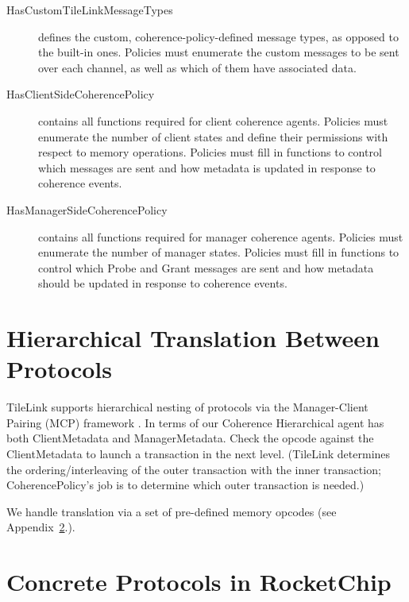 \begin{description}
\item[HasCustomTileLinkMessageTypes] defines the custom, coherence-policy-defined message types, as opposed to the built-in ones. Policies must enumerate the custom messages to be sent over each channel, as well as which of them have associated data.
\item[HasClientSideCoherencePolicy] contains all functions required for client coherence agents. Policies must enumerate the number of client states and define their permissions with respect to memory operations. Policies must fill in functions to control which messages are sent and how metadata is updated in response to coherence events.
\item[HasManagerSideCoherencePolicy] contains all functions required for manager coherence agents. Policies must enumerate the number of manager states. Policies must fill in functions to control which Probe and Grant messages are sent and how  metadata should be updated in response to coherence events.
\end{description}


\section{Hierarchical Translation Between Protocols}

TileLink supports hierarchical nesting of protocols via the Manager-Client Pairing (MCP) framework \cite{beu2011manager}.
In terms of our Coherence 
Hierarchical agent has both ClientMetadata and ManagerMetadata. 
Check the opcode against the ClientMetadata to launch a transaction in the next level.
(TileLink determines the ordering/interleaving of the outer transaction with the inner transaction;
CoherencePolicy's job is to determine which outer transaction is needed.)

We handle translation via a set of pre-defined memory opcodes (see Appendix~\ref{}.).

\section{Concrete Protocols in RocketChip}

